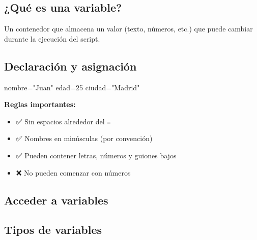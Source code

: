 \documentclass[
  spanish,
  12pt,
  letterpaper,
  DIV=11,
  numbers=noendperiod]{scrreprt}
\newenvironment{Shaded}{\begin{snugshade}}{\end{snugshade}}
\newcommand{\BuiltInTok}[1]{\textcolor[rgb]{0.00,0.23,0.31}{#1}}
\newcommand{\CommentTok}[1]{\textcolor[rgb]{0.37,0.37,0.37}{#1}}
\newcommand{\NormalTok}[1]{\textcolor[rgb]{0.00,0.23,0.31}{#1}}
\newcommand{\OperatorTok}[1]{\textcolor[rgb]{0.37,0.37,0.37}{#1}}
\newcommand{\StringTok}[1]{\textcolor[rgb]{0.13,0.47,0.30}{#1}}
\newcommand{\VariableTok}[1]{\textcolor[rgb]{0.07,0.07,0.07}{#1}}
\providecommand{\tightlist}{%
  \setlength{\itemsep}{0pt}\setlength{\parskip}{0pt}}
\begin{document}
\subsection{¿Qué es una variable?}\label{quuxe9-es-una-variable}

Un contenedor que almacena un valor (texto, números, etc.) que puede
cambiar durante la ejecución del script.

\subsection{Declaración y
asignación}\label{declaraciuxf3n-y-asignaciuxf3n}

\begin{Shaded}
\begin{Highlighting}[]
\VariableTok{nombre}\OperatorTok{=}\StringTok{"Juan"}
\VariableTok{edad}\OperatorTok{=}\NormalTok{25}
\VariableTok{ciudad}\OperatorTok{=}\StringTok{"Madrid"}
\end{Highlighting}
\end{Shaded}

\textbf{Reglas importantes:}

\begin{itemize}
\tightlist
\item
  ✅ Sin espacios alrededor del \texttt{=}
\item
  ✅ Nombres en minúsculas (por convención)
\item
  ✅ Pueden contener letras, números y guiones bajos
\item
  ❌ No pueden comenzar con números
\end{itemize}

\subsection{Acceder a variables}\label{acceder-a-variables}

\begin{Shaded}
\end{Shaded}

\subsection{Tipos de variables}\label{tipos-de-variables}
\end{document}
